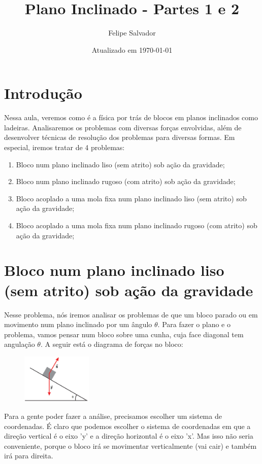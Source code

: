 \documentclass[12pt]{extarticle}
\title{Plano Inclinado - Partes 1 e 2}
\author{Felipe Salvador}
\date{Atualizado em \today}
\newcommand{\<}{\langle}
\renewcommand{\>}{\rangle}
\theoremstyle{definition}
\begin{document}
\maketitle

\section{Introdução}

Nessa aula, veremos como é a física por trás de blocos em planos inclinados como ladeiras. Analisaremos os problemas com diversas forças envolvidas, além de desenvolver técnicas de resolução dos problemas para diversas formas. Em especial, iremos tratar de 4 problemas:
\begin{enumerate}
    \item Bloco num plano inclinado liso (sem atrito) sob ação da gravidade;
    \item Bloco num plano inclinado rugoso (com atrito) sob ação da gravidade;
    \item Bloco acoplado a uma mola fixa num plano inclinado liso (sem atrito) sob ação da gravidade;
    \item Bloco acoplado a uma mola fixa num plano inclinado rugoso (com atrito) sob ação da gravidade;
\end{enumerate}

\section{Bloco num plano inclinado liso (sem atrito) sob ação da gravidade}

Nesse problema, nós iremos analisar os problemas de que um bloco parado ou em movimento num plano inclinado por um ângulo $\theta$. Para fazer o plano e o problema, vamos pensar num bloco sobre uma cunha, cuja face diagonal tem angulação $\theta$. A seguir está o diagrama de forças no bloco:
\begin{figure}[H]
    \centering
    \includegraphics[width=0.3\textwidth]{screenshot_66.png}
    \label{fig:inclinado_1}
\end{figure}

Para a gente poder fazer a análise, precisamos escolher um sistema de coordenadas. É claro que podemos escolher o sistema de coordenadas em que a direção vertical é o eixo 'y' e a direção horizontal é o eixo 'x'. Mas isso não seria conveniente, porque o bloco irá se movimentar verticalmente (vai cair) e também irá para direita.
\end{document}
